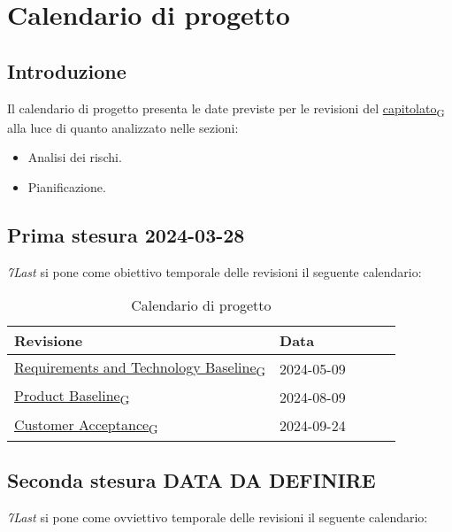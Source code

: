 \section{Calendario di progetto}
\subsection{Introduzione}
Il calendario di progetto presenta le date previste per le revisioni del \href{https://7last.github.io/docs/rtb/documentazione-interna/glossario\#capitolato}{capitolato\textsubscript{G}} alla luce di quanto analizzato nelle sezioni:
\begin{itemize}
    \item Analisi dei rischi. 
    \item Pianificazione.
\end{itemize}

\subsection{Prima stesura 2024-03-28}
\textit{7Last} si pone come obiettivo temporale delle revisioni il seguente calendario:
\begin{table}[!h]
    \begin{center}
        \begin{tabular}{ |l |l |l |l| l| }
            \hline 
            Revisione                               & Data       \\ \hline
            \href{https://7last.github.io/docs/rtb/documentazione-interna/glossario\#requirements-and-technology-baseline}{Requirements and Technology Baseline\textsubscript{G}}    & 2024-05-09 \\
            \href{https://7last.github.io/docs/rtb/documentazione-interna/glossario\#product-baseline}{Product Baseline\textsubscript{G}}                        & 2024-08-09 \\
            \href{https://7last.github.io/docs/rtb/documentazione-interna/glossario\#customer-acceptance}{Customer Acceptance\textsubscript{G}}                     & 2024-09-24 \\
            \hline
        \end{tabular}
    \end{center}
    \caption{Calendario di progetto}
    \label{tab:1}
\end{table}
\newpage

\subsection{Seconda stesura DATA DA DEFINIRE}
\textit{7Last} si pone come ovviettivo temporale delle revisioni il seguente calendario:

